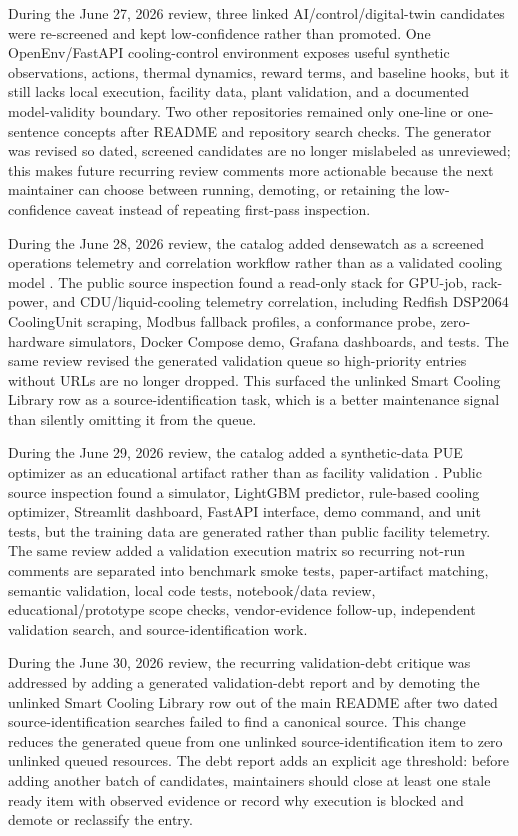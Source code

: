 \documentclass[11pt]{article}
\begin{document}
During the June 27, 2026 review, three linked AI/control/digital-twin candidates were re-screened and kept low-confidence rather than promoted. One OpenEnv/FastAPI cooling-control environment exposes useful synthetic observations, actions, thermal dynamics, reward terms, and baseline hooks, but it still lacks local execution, facility data, plant validation, and a documented model-validity boundary. Two other repositories remained only one-line or one-sentence concepts after README and repository search checks. The generator was revised so dated, screened candidates are no longer mislabeled as unreviewed; this makes future recurring review comments more actionable because the next maintainer can choose between running, demoting, or retaining the low-confidence caveat instead of repeating first-pass inspection.

During the June 28, 2026 review, the catalog added densewatch as a screened operations telemetry and correlation workflow rather than as a validated cooling model \cite{Densewatch2026}. The public source inspection found a read-only stack for GPU-job, rack-power, and CDU/liquid-cooling telemetry correlation, including Redfish DSP2064 CoolingUnit scraping, Modbus fallback profiles, a conformance probe, zero-hardware simulators, Docker Compose demo, Grafana dashboards, and tests. The same review revised the generated validation queue so high-priority entries without URLs are no longer dropped. This surfaced the unlinked Smart Cooling Library row as a source-identification task, which is a better maintenance signal than silently omitting it from the queue.

During the June 29, 2026 review, the catalog added a synthetic-data PUE optimizer as an educational artifact rather than as facility validation \cite{DataCenterPUEOptimizer2026}. Public source inspection found a simulator, LightGBM predictor, rule-based cooling optimizer, Streamlit dashboard, FastAPI interface, demo command, and unit tests, but the training data are generated rather than public facility telemetry. The same review added a validation execution matrix so recurring not-run comments are separated into benchmark smoke tests, paper-artifact matching, semantic validation, local code tests, notebook/data review, educational/prototype scope checks, vendor-evidence follow-up, independent validation search, and source-identification work.

During the June 30, 2026 review, the recurring validation-debt critique was addressed by adding a generated validation-debt report and by demoting the unlinked Smart Cooling Library row out of the main README after two dated source-identification searches failed to find a canonical source. This change reduces the generated queue from one unlinked source-identification item to zero unlinked queued resources. The debt report adds an explicit age threshold: before adding another batch of candidates, maintainers should close at least one stale ready item with observed evidence or record why execution is blocked and demote or reclassify the entry.
\end{document}
